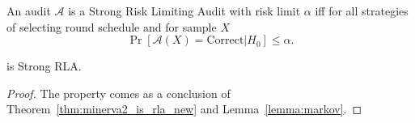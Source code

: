\begin{definition}
 An audit $\mathcal{A}$ is a Strong Risk Limiting Audit with risk limit $\alpha$ iff for
 all strategies of selecting round schedule and for sample $X$ 
 \[
  \Pr\left[\mathcal{A}(X) = \text{Correct} | H_0\right] \leq \alpha.
 \]

\end{definition}

\begin{lemma}
\Providence is Strong RLA. 
\end{lemma}
\begin{proof}
 The property comes as a conclusion of Theorem~\ref{thm:minerva2_is_rla_new} and Lemma~\ref{lemma:markov}.
\end{proof}







% 
% 

